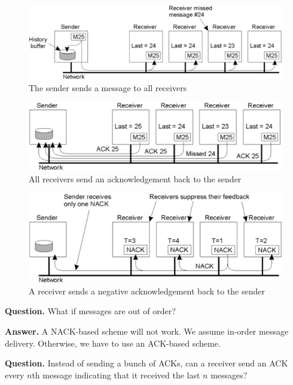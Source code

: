 \documentclass[twoside]{article}
\begin{document}
\begin{figure}[h]
	\centering
    \includegraphics[scale=0.47]{reliable-one-many-communication-1.png}
	\caption{The sender sends a message to all receivers}
	\label{fig:reliable-one-many-communication-1}
\end{figure}

\begin{figure}[h]
	\centering
    \includegraphics[scale=0.47]{reliable-one-many-communication-2.png}
	\caption{All receivers send an acknowledgement back to the sender}
	\label{fig:reliable-one-many-communication-2}
\end{figure}

\begin{figure}[h]
	\centering
    \includegraphics[scale=0.47]{reliable-one-many-communication-3.png}
	\caption{A receiver sends a negative acknowledgement back to the sender}
	\label{fig:reliable-one-many-communication-3}
\end{figure}

\textbf{Question.} What if messages are out of order?

\textbf{Answer.} A NACK-based scheme will not work. We assume in-order message delivery. Otherwise, we have to use an ACK-based scheme.

\textbf{Question.} Instead of sending a bunch of {\ttfamily ACK}s, can a receiver send an {\ttfamily ACK} every $n$th message indicating that it received the last $n$ messages?
\end{document}
